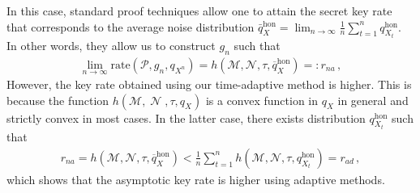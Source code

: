 \documentclass[11pt]{article}
\newcommand{\1}{\ensuremath{\mathbbm{1}}}
\theoremstyle{newdefinition}
\theoremstyle{newplain}
\theoremstyle{myplain}
\DeclareMathOperator{\cH}{\mathcal{H}}
\DeclareMathOperator{\cM}{\mathcal{M}}
\DeclareMathOperator{\cD}{\mathcal{D}}
\DeclareMathOperator{\cN}{\mathcal{N}}
\begin{document}
In this case, standard proof techniques \cite{Renner.2006, Metger.2024,Himbeeck.2025} allow one to attain the secret key rate that corresponds to the average noise distribution $\bar q^{\mathrm{hon}}_X = \lim_{n\to \infty}\frac{1}{n} \sum_{t=1}^n q^{\mathrm{hon}}_{X_t}$. In other words, they allow us to construct $g_n$ such that 
\begin{align}
    \lim_{n\to \infty} \mathrm{rate}(\mathcal P, g_n,q_{X^n}) = h(\mathcal M,\mathcal N,\tau, \overline{q}^{\mathrm{hon}}_X) =: r_{na}\,,
\end{align}
However, the key rate obtained using our time-adaptive method is higher. This is because the function $h(\mathcal M, \cN, \tau, q_X)$ is a convex function in $q_X$ in general \cite{Winick.2018} and strictly convex in most cases. In the latter case, there exists distribution $q_{X_t}^{\mathrm{hon}}$ such that
\begin{align}
    r_{na} = h(\mathcal M,\mathcal N,\tau, \overline{q}^{\mathrm{hon}}_X) < \frac{1}{n} \sum_{t=1}^n h(\mathcal M,\mathcal N,\tau,q^{\mathrm{hon}}_{X_t}) = r_{ad}\,,
\end{align}
which shows that the asymptotic key rate is higher using adaptive methods. 
\end{document}
